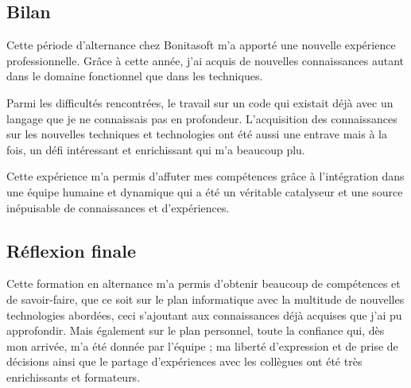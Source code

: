 \subsection{Bilan}
Cette période d'alternance chez Bonitasoft m'a apporté une nouvelle expérience professionnelle. Grâce à cette année, j'ai acquis de nouvelles connaissances autant dans le domaine fonctionnel que dans les techniques.

Parmi les difficultés rencontrées, le travail sur un code qui existait déjà avec un langage que je ne connaissais pas en profondeur. L'acquisition des connaissances sur les nouvelles techniques et  technologies ont été aussi une entrave mais à la fois, un défi intéressant et enrichissant qui m'a beaucoup plu.

Cette expérience m'a permis d'affuter mes compétences grâce à l'intégration dans une équipe humaine et dynamique qui a été un véritable catalyseur et une source inépuisable de connaissances et d'expériences.


\subsection{Réflexion finale}
Cette formation en alternance m'a permis d'obtenir beaucoup de compétences et de savoir-faire, que ce soit sur le plan informatique avec la multitude de nouvelles technologies abordées, ceci s'ajoutant aux connaissances déjà acquises que j'ai pu approfondir. Mais également sur le plan personnel, toute la confiance qui, dès mon arrivée, m'a été donnée par l'équipe ; ma liberté d'expression et de prise de décisions ainsi que le partage d'expériences avec les collègues ont été très enrichissants et formateurs.
